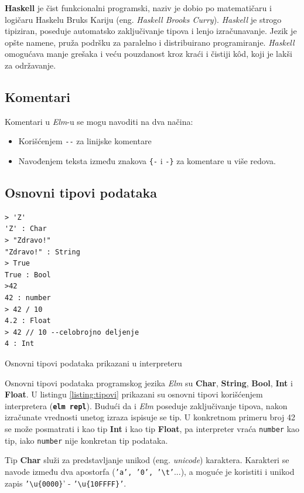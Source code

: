 \documentclass[12pt,oneside]{memoir}
\begin{document}
\textbf{Haskell}\cite{haskell} je čist funkcionalni programski, naziv je dobio po matematičaru i 
logičaru Haskelu Bruks Kariju (eng. \emph{Haskell Brooks Curry}). \emph{Haskell} je strogo 
tipiziran, poseduje automatsko zaključivanje tipova i lenjo izračunavanje. Jezik je 
opšte namene, pruža podršku za paralelno i distribuirano programiranje. \emph{Haskell} 
omogućava manje grešaka i veću pouzdanost kroz kraći i čistiji k\^{o}d, koji je lakši za
održavanje. 


\subsection{Komentari}
Komentari u \emph{Elm}-u se mogu navoditi na dva načina: \begin{itemize}
  \item Korišćenjem \texttt{-{}-} za linijske komentare
  \item Navođenjem teksta između znakova \texttt{\{-} i \texttt{-\}} za komentare u više redova.    
\end{itemize}

\subsection{Osnovni tipovi podataka}
\begin{listing}[h]
\begin{verbatim}
> 'Z'
'Z' : Char
> "Zdravo!"
"Zdravo!" : String
> True
True : Bool
>42
42 : number
> 42 / 10 
4.2 : Float
> 42 // 10 --celobrojno deljenje
4 : Int
\end{verbatim}
\caption{Osnovni tipovi podataka prikazani u interpreteru}
\label{listing:tipovi}
\end{listing}
Osnovni tipovi podataka programskog jezika \emph{Elm} su \textbf{Char}, \textbf{String}, \textbf{Bool},
\textbf{Int} i \textbf{Float}. U listingu \ref{listing:tipovi} prikazani su osnovni
tipovi korišćenjem interpretera (\texttt{\textbf{elm repl}}). Budući da i \emph{Elm} poseduje zaključivanje tipova, nakon
izračunate vrednosti unetog izraza ispisuje se tip. U konkretnom primeru broj 42 se
može posmatrati i kao tip \textbf{Int} i kao tip \textbf{Float}, pa interpreter vraća
\texttt{number} kao tip, iako \texttt{number} nije konkretan tip podataka.


Tip \textbf{Char} služi za predstavljanje unikod (eng. \emph{unicode}) karaktera.
Karakteri se navode između dva apostorfa (\texttt{'a', '0', '\textbackslash t'}...), a
moguće je koristiti i unikod zapis  \texttt{'\textbackslash u\{0000\}}' -
\texttt{'\textbackslash u\{10FFFF\}'}.
\end{document}
